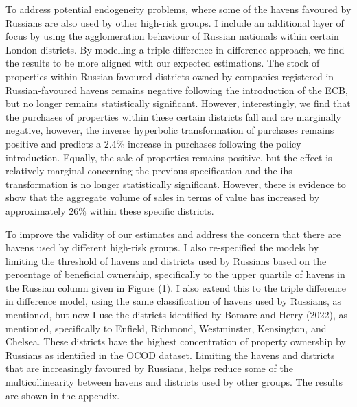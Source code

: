 \documentclass{article}
\begin{document}
To address potential endogeneity problems, where some of the havens favoured by Russians are also used by other high-risk groups. I include an additional layer of focus by using the agglomeration behaviour of Russian nationals within certain London districts. By modelling a triple difference in difference approach, we find the results to be more aligned with our expected estimations. The stock of properties within Russian-favoured districts owned by companies registered in Russian-favoured havens remains negative following the introduction of the ECB, but no longer remains statistically significant. However, interestingly, we find that the purchases of properties within these certain districts fall and are marginally negative, however, the inverse hyperbolic transformation of purchases remains positive and predicts a 2.4${\%}$ increase in purchases following the policy introduction.  Equally, the sale of properties remains positive, but the effect is relatively marginal concerning the previous specification and the ihs transformation is no longer statistically significant. However, there is evidence to show that the aggregate volume of sales in terms of value has increased by approximately 26${\%}$ within these specific districts. 

To improve the validity of our estimates and address the concern that there are havens used by different high-risk groups. I also re-specified the models by limiting the threshold of havens and districts used by Russians based on the percentage of beneficial ownership, specifically to the upper quartile of havens in the Russian column given in Figure (1). I also extend this to the triple difference in difference model, using the same classification of havens used by Russians, as mentioned, but now I use the districts identified by Bomare and Herry (2022), as mentioned, specifically to Enfield, Richmond, Westminster, Kensington, and Chelsea. These districts have the highest concentration of property ownership by Russians as identified in the OCOD dataset. Limiting the havens and districts that are increasingly favoured by Russians, helps reduce some of the multicollinearity between havens and districts used by other groups. The results are shown in the appendix. 
\end{document}
